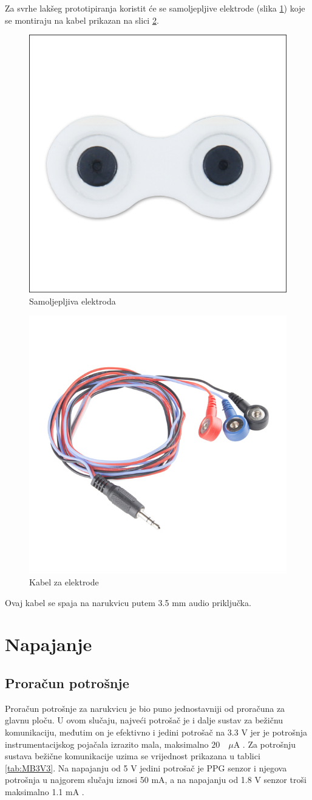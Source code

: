 Za svrhe lakšeg prototipiranja koristit će se samoljepljive elektrode (slika \ref{slk:ELECTRODE}) koje se montiraju na kabel prikazan na slici \ref{slk:CABLE}. 
\begin{figure}[htb]
    \centering
    \includegraphics[width=6 cm]{Figures/ELECTRODE-BOTTOM.jpg}
    \caption{Samoljepljiva elektroda}
    \label{slk:ELECTRODE}
\end{figure}
\begin{figure}
    \centering
    \includegraphics[width=6 cm]{Figures/CABLE.jpg}
    \caption{Kabel za elektrode}
    \label{slk:CABLE}
\end{figure}
Ovaj kabel se spaja na narukvicu putem 3.5 mm audio priključka.

\section{Napajanje}
\subsection{Proračun potrošnje}

Proračun potrošnje za narukvicu je bio puno jednostavniji od proračuna za glavnu ploču. U ovom slučaju, najveći potrošač je i dalje sustav za bežičnu komunikaciju, međutim on je efektivno i jedini potrošač na 3.3 V jer je potrošnja instrumentacijskog pojačala izrazito mala, maksimalno $20\quad \mu \textrm{A}$ \cite{ad:ad8226}. Za potrošnju sustava bežične komunikacije uzima se vrijednost prikazana u tablici \ref{tab:MB3V3}. Na napajanju od 5 V jedini potrošač je PPG senzor i njegova potrošnja u najgorem slučaju iznosi 50 mA, a na napajanju od 1.8 V senzor troši maksimalno 1.1 mA \cite{ad:max30101}.

